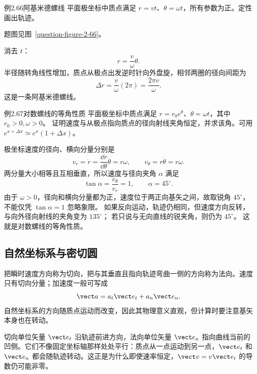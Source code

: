 \begin{origexamplebox}{例2.66\quad 阿基米德螺线}
平面极坐标中质点满足 $r=vt$、$\theta=\omega t$，所有参数为正。定性画出轨迹。
\par 题图见图~\ref{question-figure-2-66}。
\KQuestionCO
\end{origexamplebox}
\begin{xesolution}
消去 $t$：
\[
 \boxed{r=\frac v\omega\theta}.
\]
半径随转角线性增加，质点从极点出发逆时针向外盘旋，相邻两圈的径向间距为
\[
\Delta r=\frac v\omega(2\pi)=\frac{2\pi v}{\omega}.
\]
这是一条阿基米德螺线。
\ArchimedeanSpiralDiagram
\end{xesolution}

\begin{origexamplebox}{例2.67\quad 对数螺线的等角性质}
平面极坐标中质点满足 $r=r_0e^\theta$、$\theta=\omega t$，其中 $r_0>0,\omega>0$。
证明速度与从极点指向质点的径向射线夹角恒定，并求该角。可用 $e^{x+\Delta x}\simeq e^x(1+\Delta x)$。
\end{origexamplebox}
\begin{xesolution}
极坐标速度的径向、横向分量分别是
\[
v_r=\dot r=\frac{\dd r}{\dd\theta}\dot\theta=r\omega,
\qquad
v_\theta=r\dot\theta=r\omega.
\]
两分量大小相等且互相垂直，所以速度与径向夹角 $\alpha$ 满足
\[
 \tan\alpha=\frac{v_\theta}{v_r}=1,
 \qquad \boxed{\alpha=45^\circ}.
\]
由于 $\omega>0$，径向和横向分量都为正，速度位于两正向基矢之间，故取锐角 $45^\circ$，不能仅凭 $\tan\alpha=1$ 忽略象限。
如果反向运动，轨迹仍相同，但速度方向反转，与向外径向射线的夹角变为 $135^\circ$；
若只说与无向直线的锐夹角，则仍为 $45^\circ$。
这就是对数螺线的等角性质。
\end{xesolution}

\subsection{自然坐标系与密切圆}

\NaturalCoordinatesDiagram

把瞬时速度方向称为切向，把与其垂直且指向轨迹弯曲一侧的方向称为法向。速度只有切向分量；加速度一般可写成
\[
\vect a=a_t\vect e_t+a_n\vect e_n.
\]
自然坐标系的方向随质点运动而改变，因此其物理意义直观，但计算时要注意基矢本身也在转动。

切向单位矢量 $\vect e_t$ 沿轨迹前进方向，法向单位矢量 $\vect e_n$ 指向曲线当前的凹侧。它们不像固定坐标轴那样处处平行：质点从一点运动到另一点，$\vect e_t$ 和 $\vect e_n$ 都会随轨迹转动。这正是为什么即使速率恒定，$\vect v=v\vect e_t$ 的导数仍可能非零。

